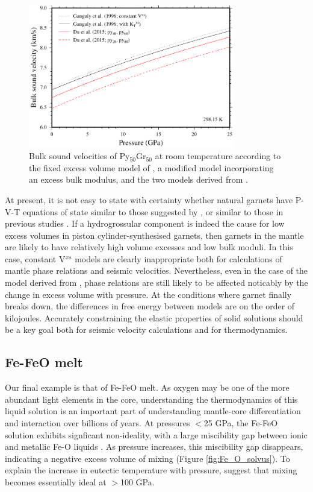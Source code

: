 \documentclass[review]{elsarticle}
\begin{document}
\begin{figure}[ht!]
  \centering
  \includegraphics[width=0.8\textwidth]{figures/pyrope_grossular_bulk_sound_velocities}
  \caption{Bulk sound velocities of Py$_{50}$Gr$_{50}$ at room temperature according to the fixed excess volume model of \citep{GCT1996}, a modified model incorporating an excess bulk modulus, and the two models derived from \cite{DCW2015}.}
  \label{fig:bulk_sound_garnet}
\end{figure}

At present, it is not easy to state with certainty whether natural garnets have P-V-T equations of state similar to those suggested by \cite{DCW2015}, or similar to those in previous studies \citep{NCK1977, BG1997, GCT1996}. If a hydrogrossular component is indeed the cause for low excess volumes in piston cylinder-synthesised garnets, then garnets in the mantle are likely to have relatively high volume excesses and low bulk moduli. In this case, constant V$^{xs}$ models are clearly inappropriate both for calculations of mantle phase relations and seismic velocities. Nevertheless, even in the case of the model derived from \cite{GCT1996}, phase relations are still likely to be affected noticably by the change in excess volume with pressure. At the conditions where garnet finally breaks down, the differences in free energy between models are on the order of kilojoules. Accurately constraining the elastic properties of solid solutions should be a key goal both for seismic velocity calculations and for thermodynamics.

\clearpage
\subsection{Fe-FeO melt}
Our final example is that of Fe-FeO melt. As oxygen may be one of the more abundant light elements in the core, understanding the thermodynamics of this liquid solution is an important part of understanding mantle-core differentiation and interaction over billions of years. At pressures $<$25 GPa, the Fe-FeO solution exhibits signficant non-ideality, with a large miscibility gap between ionic and metallic Fe-O liquids \citep{KS1995,TOT2007,Frostetal2010}. As pressure increases, this miscibility gap disappears, indicating a negative excess volume of mixing (Figure \ref{fig:Fe_O_solvus}). To explain the increase in eutectic temperature with pressure, \cite{Kom2014} suggest that mixing becomes essentially ideal at $>$100 GPa. 
\end{document}
